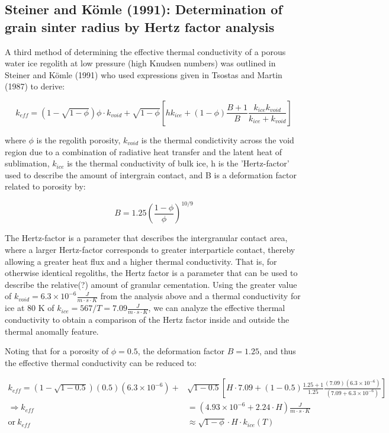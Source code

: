 \documentclass[11pt]{article} %
\begin{document}
\subsection{Steiner and K\"{o}mle (1991): Determination of grain sinter radius by Hertz factor analysis}

	A third method of determining the effective thermal conductivity of a porous water ice regolith at low pressure (high Knudsen numbers) was outlined in Steiner and K\"{o}mle (1991) who used expressions given in Tsostas and Martin (1987) to derive:

	\begin{equation}
	k_{eff} = (1-\sqrt{1-\phi})\phi \cdot k_{void} + \sqrt{1-\phi}[hk_{ice}+(1-\phi)\frac{B+1}{B}\frac{k_{ice}k_{void}}{k_{ice}+k_{void}}]
	\end{equation}
	
	where $\phi$ is the regolith porosity, $k_{void}$ is the thermal condictivity across the void region due to a combination of radiative heat transfer and the latent heat of sublimation, $k_{ice}$ is the thermal conductivity of bulk ice, h is the 'Hertz-factor' used to describe the amount of intergrain contact, and B is a deformation factor related to porosity by:
	
	\begin{equation}
	B = 1.25 ( \frac{1-\phi}{\phi} )^{10/9}
	\end{equation}
	
	The Hertz-factor is a parameter that describes the intergranular contact area, where a larger Hertz-factor corresponds to greater interparticle contact, thereby allowing a greater heat flux and a higher thermal conductivity. That is, for otherwise identical regoliths, the Hertz factor is a parameter that can be used to describe the relative(?) amount of granular cementation. Using the greater value of $k_{void} = 6.3\times10^{-6} \frac{J}{m \cdot s \cdot K}$ from the analysis above and a thermal conductivity for ice at 80 K of $k_{ice} = 567/T = 7.09 \frac{J}{m \cdot s \cdot K}$, we can analyze the effective thermal conductivity to obtain a comparison of the Hertz factor inside and outside the thermal anomally feature.
	
	Noting that for a porosity of $\phi = 0.5$, the deformation factor $B = 1.25$, and thus the effective thermal conductivity can be reduced to:
	
	\begin{equation}
	\begin{split}
	k_{eff} = (1-\sqrt{1-0.5})(0.5)(6.3\times10^{-6}) + &\sqrt{1-0.5} [ H \cdot 7.09+(1-0.5)\frac{1.25+1}{1.25}\frac{(7.09)(6.3\times10^{-6})}{(7.09+6.3\times10^{-6})} ] \\
	\Rightarrow k_{eff} &= ( 4.93\times 10^{-6} + 2.24\cdot H )  \frac{J}{m \cdot s \cdot K} \\
	\text{or} \: k_{eff} &\approx \sqrt{1-\phi}\cdot H \cdot k_{ice}(T)
	\end{split}
	\end{equation}
	
\end{document}
